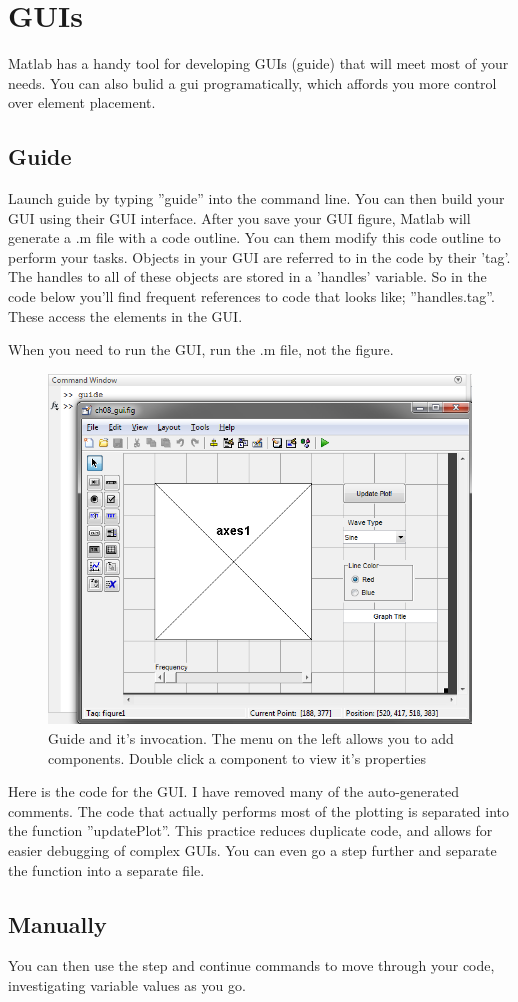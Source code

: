 
\pagebreak
\section{GUIs}
Matlab has a handy tool for developing GUIs (guide) that will meet most of your needs.
 You can also bulid a gui programatically, which affords you more control over element placement.

\subsection{Guide}
Launch guide by typing ''guide'' into the command line.
 You can then build your GUI using their GUI interface.
 After you save your GUI figure, Matlab will generate a .m file with a code outline.
 You can them modify this code outline to perform your tasks.
 Objects in your GUI are referred to in the code by their 'tag'.
 The handles to all of these objects are stored in a 'handles' variable.
 So in the code below you'll find frequent references to code that looks like; ''handles.tag''.
 These access the elements in the GUI.

When you need to run the GUI, run the .m file, not the figure.

\begin{figure}[ht!]
\centering
\includegraphics[width=120mm]{img/guide.png}
\caption{Guide and it's invocation.
 The menu on the left allows you to add components.
 Double click a component to view it's properties}
\label{guiload}
\end{figure}

\pagebreak
Here is the code for the GUI.
 I have removed many of the auto-generated comments.
 The code that actually performs most of the plotting is separated into the function ''updatePlot''.
 This practice reduces duplicate code, and allows for easier debugging of complex GUIs.
 You can even go a step further and separate the function into a separate file.

\begin{quote}

\end{quote}

\pagebreak
\subsection{Manually}
You can then use the step and continue commands to move through your code, investigating variable values as you go.

\begin{quote}
 
\end{quote}
